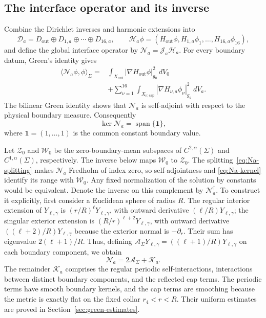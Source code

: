 \documentclass[11pt,a4paper,twoside]{article}
\numberwithin{equation}{section}
\theoremstyle{definition}
\theoremstyle{remark}
\begin{document}
\subsection{The interface operator and its inverse}
\label{subsec:block-operators}

Combine the Dirichlet inverses and harmonic extensions into
\[
\mathcal D_a=D_{\mathrm{out}}\oplus D_{1,a}\oplus\cdots\oplus D_{16,a},
\qquad
\mathcal H_a\phi=(H_{\mathrm{out}}\phi,
H_{1,a}\phi_1,\ldots,H_{16,a}\phi_{16}),
\]
and define the global interface operator by
\(\mathcal N_a=\mathcal J_a\mathcal H_a\).
For every boundary datum,
Green's identity gives
\begin{equation}\label{eq:Na-energy}
\begin{aligned}
\langle\mathcal N_a\phi,\phi\rangle_\Sigma
={}&
\int_{X_{\mathrm{out}}}
|\nabla H_{\mathrm{out}}\phi|_{g_0}^2\,dV_0\\
&+
\sum_{\nu=1}^{16}
\int_{X_{\nu,\mathrm{cap}}}
|\nabla H_{\nu,a}\phi_\nu|_{g_a}^2\,dV_a.
\end{aligned}
\end{equation}
The bilinear Green identity shows that \(\mathcal N_a\) is
self-adjoint with respect to the physical boundary measure.
Consequently
\begin{equation}\label{eq:Na-kernel}
\ker\mathcal N_a
=
\operatorname{span}\{\mathbf 1\},
\end{equation}
where \(\mathbf 1=(1,\ldots,1)\) is the common constant boundary value.

Let \(\mathcal Z_0\) and \(\mathcal W_0\) be the zero-boundary-mean
subspaces of \(C^{2,\alpha}(\Sigma)\) and \(C^{1,\alpha}(\Sigma)\),
respectively.
The inverse below maps \(\mathcal W_0\) to \(\mathcal Z_0\).
The splitting~\eqref{eq:Na-splitting} makes \(\mathcal N_a\)
Fredholm of index zero, so self-adjointness and
\eqref{eq:Na-kernel} identify its range with \(\mathcal W_0\).
Any fixed normalization of the solution by constants would be equivalent.
Denote the inverse on this complement by \(\mathcal N_a^\dagger\).
To construct it explicitly, first consider a Euclidean sphere of
radius \(R\). The regular interior extension of
\(Y_{\ell,\gamma}\) is \((r/R)^\ell Y_{\ell,\gamma}\), with
outward derivative \((\ell/R)Y_{\ell,\gamma}\); the singular exterior
extension is \((R/r)^{\ell+2}Y_{\ell,\gamma}\), with outward derivative
\(((\ell+2)/R)Y_{\ell,\gamma}\) because the exterior normal is
\(-\partial_r\). Their sum has eigenvalue \(2(\ell+1)/R\).
Thus, defining
\(\mathcal A_\Sigma Y_{\ell,\gamma}=((\ell+1)/R)Y_{\ell,\gamma}\)
on each boundary component, we obtain
\begin{equation}\label{eq:Na-splitting}
\mathcal N_a
=
2\mathcal A_\Sigma
+
\mathcal K_a.
\end{equation}
The remainder \(\mathcal K_a\) comprises the regular periodic
self-interactions, interactions between distinct boundary components,
and the reflected cap terms. The periodic terms have smooth boundary
kernels, and the cap terms are smoothing because the metric is exactly
flat on the fixed collar \(r_4<r<R\). Their uniform estimates are
proved in Section~\ref{sec:green-estimates}.
\end{document}
